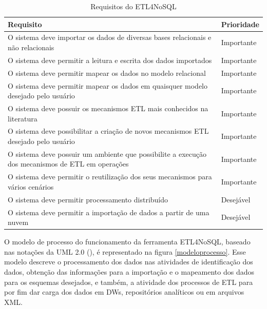 \begin{table}[h]
	\centering
	\caption{Requisitos do ETL4NoSQL}
	\label{requisitos}
	\begin{tabular}{|p{11cm}| p{2cm} |}
		\hline
		Requisito & Prioridade\\
		\hline
		O sistema deve importar os dados de diversas bases relacionais e não relacionais & Importante\\
		\hline
		O sistema deve permitir a leitura e escrita dos dados importados & Importante\\
		\hline
		O sistema deve permitir mapear os dados no modelo relacional & Importante\\
		\hline
		O sistema deve permitir mapear os dados em quaisquer modelo desejado pelo usuário & Importante\\
		\hline
		O sistema deve possuir os mecanismos ETL mais conhecidos na literatura & Importante\\
		\hline
		O sistema deve possibilitar a criação de novos mecanismos ETL desejado pelo usuário & Importante\\
		\hline
		O sistema deve possuir um ambiente que possibilite a execução dos mecanismos de ETL em operações & Importante\\
		\hline
		O sistema deve permitir o reutilização dos seus mecanismos para vários cenários & Importante\\
		\hline
		O sistema deve permitir processamento distribuído & Desejável\\
		\hline
		O sistema deve permitir a importação de dados a partir de uma nuvem & Desejável\\
		\hline
		
		
	\end{tabular}
\end{table}

O modelo de processo do funcionamento da ferramenta ETL4NoSQL, baseado nas notações da UML 2.0 (\cite{clements:2002}), é representado na figura \ref{modeloprocesso}. Esse modelo descreve o processamento dos dados nas atividades de identificação dos dados, obtenção das informações para a importação e o mapeamento dos dados para os esquemas desejados, e também, a atividade dos processos de ETL para por fim dar carga dos dados em DWs, repositórios analíticos ou em arquivos XML.

